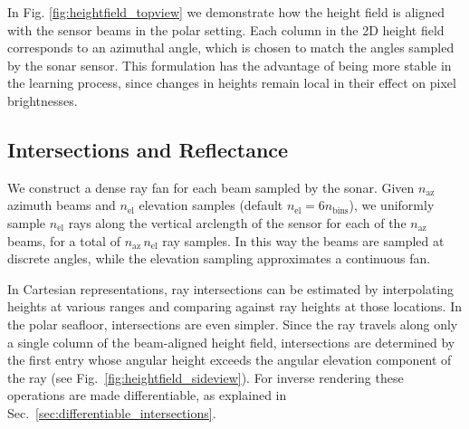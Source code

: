 In Fig. \ref{fig:heightfield_topview} we demonstrate how the height field is aligned with the sensor beams in the polar setting. Each column in the 2D height field corresponds to an azimuthal angle, which is chosen to match the angles sampled by the sonar sensor. This formulation has the advantage of being more stable in the learning process, since changes in heights remain local in their effect on pixel brightnesses.

\subsection{Intersections and Reflectance}
\label{sec:reflectance}
We construct a dense ray fan for each beam sampled by the sonar. Given $n_\text{az}$ azimuth beams and $n_\text{el}$ elevation samples (default $n_\text{el}=6n_\text{bins}$), we uniformly sample $n_\text{el}$ rays along the vertical arclength of the sensor for each of the $n_\text{az}$ beams, for a total of $n_\text{az}\,n_\text{el}$ ray samples. In this way the beams are sampled at discrete angles, while the elevation sampling approximates a continuous fan.

In Cartesian representations, ray intersections can be estimated by interpolating heights at various ranges and comparing against ray heights at those locations. In the polar seafloor, intersections are even simpler. Since the ray travels along only a single column of the beam-aligned height field, intersections are determined by the first entry whose angular height exceeds the angular elevation component of the ray (see Fig.~\ref{fig:heightfield_sideview}). For inverse rendering these operations are made differentiable, as explained in Sec.~\ref{sec:differentiable_intersections}.

